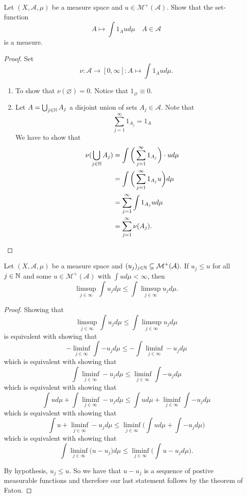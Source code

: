 \begin{thm}[Problem 9.5]
Let \((X,\mathcal{A},\mu )\) be a measure space and \(u\in \mathcal{M}^+(\mathcal{A})\). Show that the set-function
\[
A\mapsto \int 1_Aud\mu  \quad A\in \mathcal{A}
\]
is a measure.
\end{thm}

\begin{proof}
Set
\[
\nu :\mathcal{A}\rightarrow [0,\infty ]:A\mapsto \int 1_Aud\mu .
\]

\begin{enumerate}
  \item To show that \(\nu (\varnothing )=0\). Notice that \(1_\varnothing \equiv 0\).
  \item Let \(A=\bigcup _{j\in \Bbb{N}}A_{j}\) a disjoint union of sets \(A_{j}\in \mathcal{A}\). Note that
\[
\sum _{j=1}^\infty 1_{A_{j}}=1_A
\]
We have to show that
\begin{align*}
\nu (\bigcup _{j\in \Bbb{N}}A_{j})&=\int \bigg(\sum _{j=1}^\infty 1_{A_{j}}\bigg)\cdot ud\mu  \\
&=\int \bigg(\sum _{j=1}^\infty 1_{A_{j}}u\bigg)d\mu   \\
&= \sum _{j=1}^\infty \int 1_{A_{j}}ud\mu  \\
&= \sum _{j=1}^\infty  \nu (A_{j}).
\end{align*}
\end{enumerate}

\end{proof}



\begin{thm}[Problem 9.8]
Let \((X,\mathcal{A},\mu )\) be a measure space and \((u_{j})_{j\in \Bbb{N}}\subseteq \mathcal{M}^+(\mathcal{A}).\) If \(u_{j}\leq u\) for all \(j\in \Bbb{N}\) and some \(u\in \mathcal{M}^+(\mathcal{A})\) with \(\int ud\mu <\infty \), then
\[
\limsup_{j\in \infty }\int u_{j}d\mu \leq \int \limsup_{j\in \infty }u_{j}d\mu .
\]
\end{thm}

\begin{proof}
Showing that
\[
\limsup_{j\in \infty }\int u_{j}d\mu \leq \int \limsup_{j\in \infty }u_{j}d\mu 
\]
is equivalent with showing that
\[
-\liminf_{j\in \infty }\int -u_{j}d\mu \leq -\int \liminf_{j\in \infty }-u_{j}d\mu 
\]
which is equivalent with showing that
\[
\int \liminf_{j\in \infty }-u_{j}d\mu \leq \liminf_{j\in \infty }\int -u_{j}d\mu 
\]
which is equivalent with showing that
\[
\int ud\mu  + \int \liminf_{j\in \infty }-u_{j}d\mu \leq \int ud\mu  +\liminf_{j\in \infty }\int -u_{j}d\mu 
\]
which is equivalent with showing that
\[
\int u + \liminf_{j\in \infty }-u_{j}d\mu \leq \liminf_{j\in \infty }\bigg(\int ud\mu  +\int -u_{j}d\mu \bigg)
\]
which is equivalent with showing that
\[
\int  \liminf_{j\in \infty }\Big(u -u_{j}\Big)d\mu \leq \liminf_{j\in \infty }\bigg(\int u -u_{j}d\mu \bigg).
\]

By hypothesis, \(u_{j}\leq u\). So we have that \(u-u_{j}\) is a sequence of postive measurable functions and therefore our last statement follows by the theorem of Fatou.
\end{proof}
\newpage
